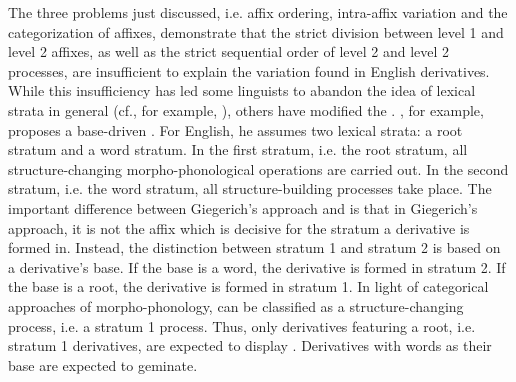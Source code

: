 The three problems just discussed, i.e. affix ordering, intra-affix variation and the categorization of affixes, demonstrate that the strict division between level 1 and level 2 affixes, as well as the strict sequential order of level 2 and level 2 processes, are insufficient to explain the variation found in English derivatives. While this insufficiency has led some linguists to  abandon the idea of lexical strata in general (cf., for example, \citealt{Johnson.1997b,Bybee.2001,Pierrehumbert.2001,Hay.2001}), others have modified the . 
\cite{Giegerich.1999}, for example, proposes a base-driven . For English, he assumes two lexical strata: a root stratum and a word stratum. In the first stratum, i.e. the root stratum, all structure-changing morpho-phonological operations are carried out. In the second stratum, i.e. the word stratum, all structure-building processes take place. The important difference between Giegerich's approach and  is that in Giegerich's approach, it is not the affix which is decisive for the stratum a derivative is formed in. Instead, the distinction between stratum 1 and stratum 2 is based on a derivative's base. If the base is a word, the derivative is formed in stratum 2. If the base is a root, the derivative is formed in stratum 1. In light of categorical approaches of morpho-phonology,  can be classified as a structure-changing process, i.e. a stratum 1 process. Thus, only derivatives featuring a root, i.e. stratum 1 derivatives, are expected to display . Derivatives with words as their base are expected to geminate.

